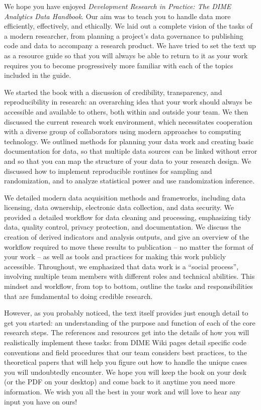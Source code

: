 We hope you have enjoyed \textit{Development Research in Practice: The DIME Analytics Data Handbook}.
Our aim was to teach you to handle data more efficiently, effectively, and ethically.
We laid out a complete vision of the tasks of a modern researcher,
from planning a project's data governance to publishing code and data
to accompany a research product.
We have tried to set the text up as a resource guide
so that you will always be able to return to it
as your work requires you to become progressively more familiar
with each of the topics included in the guide.

We started the book with a discussion of 
credibility, transparency, and reproducibility in research:
an overarching idea that your work should always be
accessible and available to others, both within and outside your team.
We then discussed the current research work environment,
which necessitates cooperation with a diverse group of collaborators
using modern approaches to computing technology.
We outlined methods for planning your data work
and creating basic documentation for data,
so that multiple data sources can be linked without error
and so that you can map the structure of your data
to your research design.
We discussed how to implement reproducible routines for sampling and randomization,
and to analyze statistical power and use randomization inference.

We detailed modern data acquisition methods and frameworks,
including data licensing, data ownership,
electronic data collection, and data security.
We provided a detailed workflow for data cleaning and processing,
emphasizing tidy data, quality control, privacy protection, and documentation.
We discuss the creation of derived indicators and analysis outputs,
and give an overview of the workflow required to move these results
to publication -- no matter the format of your work --
as well as tools and practices for making this work publicly accessible.
Throughout, we emphasized that data work is a ``social process'',
involving multiple team members with different roles and technical abilities.
This mindset and workflow, from top to bottom,
outline the tasks and responsibilities
that are fundamental to doing credible research.

However, as you probably noticed, the text itself provides
just enough detail to get you started:
an understanding of the purpose and function of each of the core research steps.
The references and resources get into the details
of how you will realistically implement these tasks:
from DIME Wiki pages detail specific code conventions
and field procedures that our team considers best practices,
to the theoretical papers that will help you figure out
how to handle the unique cases you will undoubtedly encounter.
We hope you will keep the book on your desk
(or the PDF on your desktop)
and come back to it anytime you need more information.
We wish you all the best in your work
and will love to hear any input you have on ours!

